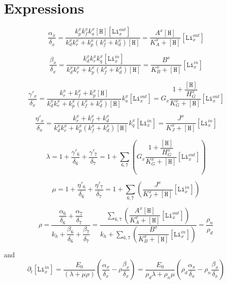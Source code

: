 \documentclass[aps,onecolumn,11pt]{revtex4}
\newcommand{\mychem}[1]{\mathtt{#1}}
\newcommand{\myconc}[1]{\left\lbrack{#1}\right\rbrack}
\newcommand{\LiIn}[1]{\myconc{\mychem{Li}_{#1}^{in}}}
\newcommand{\LiOut}[1]{\myconc{\mychem{Li}_{#1}^{out}}}
\newcommand{\Hin}{\myconc{\mychem{H}}}
\begin{document}
\section{Expressions}

\begin{equation}
	\dfrac{\alpha_x}{\delta_x} 
	= \dfrac{k_{p}^x k_f^x k_{a}^x \Hin\LiOut{x}}{k_d^x k_r^x + k_{p}^x\left(k_f^x+k_d^x\right)\Hin}
	= \dfrac{A^x\Hin}{K_A^x+\Hin}  \LiOut{x}
\end{equation}

\begin{equation}
	\dfrac{\beta_x}{\delta_x} 
	= \dfrac{k_d^x k_r^x k_{q}^x \LiIn{x}}{k_d^x k_r^x + k_{p}^x\left(k_f^x+k_d^x\right)\Hin}
	= \dfrac{B^x}{K_B^x+\Hin} \LiIn{x}
\end{equation}

\begin{equation}
	\dfrac{\gamma'_x}{\delta_x}
	=\dfrac{k_r^x + k_f^x + k_p^x \Hin }{k_d^x k_r^x + k_{p}^x\left(k_f^x+k_d^x\right)\Hin} k_a^x \LiOut{x}
	= G_x \dfrac{1+\dfrac{\Hin}{H_G^x}}{K_G^x+\Hin} \LiOut{x}
\end{equation}
	
\begin{equation}
	\dfrac{\eta'_x}{\delta_x}
	=\dfrac{k_r^x + k_f^x + k_d^x}{k_d^x k_r^x + k_{p}^x\left(k_f^x+k_d^x\right)\Hin} k_q^x \LiIn{x}
	= \dfrac{J^x}{K_J^x+\Hin} \LiIn{x}
\end{equation}
	
\begin{equation}
	\lambda = 1 + \dfrac{\gamma'_6}{\delta_6} + \dfrac{\gamma'_7}{\delta_7} 
	= 1 + \sum_{6,7}\left(G_x \dfrac{1+\dfrac{\Hin}{H_G^x}}{K_G^x+\Hin}\LiOut{x} \right) 
\end{equation}
	
\begin{equation}
	\mu = 	1 + \dfrac{\eta'_6}{\delta_6} + \dfrac{\eta'_7}{\delta_7}
	= 1 + \sum_{6,7} \left( \dfrac{J^x}{K_J^x+\Hin} \LiIn{x} \right)
\end{equation}

\begin{equation}
\rho = \dfrac{\dfrac{\alpha_6}{\delta_6}+\dfrac{\alpha_7}{\delta_7}}
	{k_h+\dfrac{\beta_6}{\delta_6}+\dfrac{\beta_7}{\delta_7}}
	=  \dfrac
	{\displaystyle\sum_{6,7} \left(\dfrac{A^x\Hin}{K_A^x+\Hin}  \LiOut{x}\right)}
	{\displaystyle k_h+\sum_{6,7}\left(\dfrac{B^x}{K_B^x+\Hin} \LiIn{x}\right)}
	= \dfrac{\rho_n}{\rho_d}
\end{equation}

and
\begin{equation}
	\partial_t\LiIn{x} = \dfrac{E_0}{\left(\lambda + \mu \rho\right)}
	\left(\dfrac{\alpha_x}{\delta_x} - \rho \dfrac{\beta_x}{\delta_x}\right)
	= \dfrac{E_0}
	{\rho_d\lambda+\rho_n\mu}
	\left(\rho_d\dfrac{\alpha_x}{\delta_x} - \rho_n \dfrac{\beta_x}{\delta_x}\right)
\end{equation}
\end{document}
